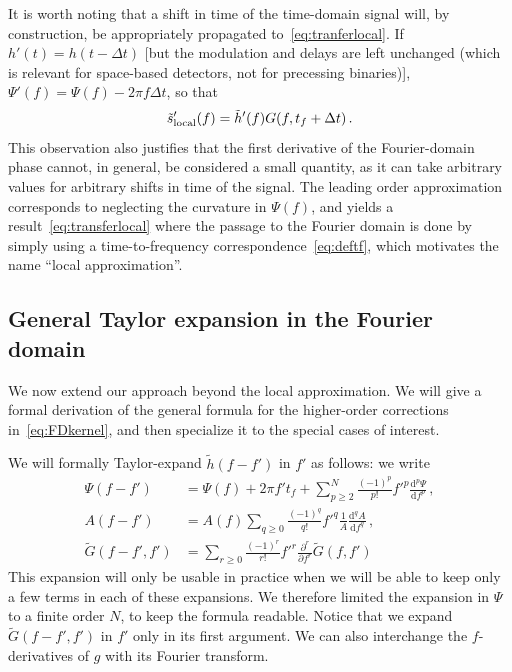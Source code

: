 \documentclass[aps,showpacs,twocolumn,
prd,superscriptaddress,nofootinbib]{revtex4-1}
\newcommand{\be}{\begin{equation}}
\newcommand{\ee}{\end{equation}}
\newcommand\ud{{\mathrm{d}}}
\newcommand{\tf}{t_{f}}
\begin{document}
It is worth noting that a shift in time of the time-domain signal will, by construction, be appropriately propagated to~\eqref{eq:tranferlocal}. If $h'(t) = h(t -  \Delta t)$ [but the modulation and delays are left unchanged (which is relevant for space-based detectors, not for precessing binaries)], $\Psi'(f) = \Psi(f) - 2\pi f \Delta t$, so that
\be\label{eq:localshifted}
	\tilde{s}'_{\rm local}(f) = \tilde{h}'(f) G(f, \tf + \Delta t) \,. 
\ee
This observation also justifies that the first derivative of the Fourier-domain phase cannot, in general, be considered a small quantity, as it can take arbitrary values for arbitrary shifts in time of the signal. The leading order approximation corresponds to neglecting the curvature in $\Psi(f)$, and yields a result~\eqref{eq:transferlocal} where the passage to the Fourier domain is done by simply using a time-to-frequency correspondence~\eqref{eq:deftf}, which motivates the name ``local approximation''.


\subsection{General Taylor expansion in the Fourier domain}
\label{subsec:TaylorFD}

We now extend our approach beyond the local approximation. We will give a formal derivation of the  general formula for the higher-order corrections in~\eqref{eq:FDkernel}, and then specialize it to the special cases of interest.

We will formally Taylor-expand $\tilde{h}(f-f')$ in $f'$ as follows: we write
\begin{subequations}
\begin{align}
	\Psi(f-f') &= \Psi(f) + 2\pi f' \tf + \sum\limits_{p\geq 2}^{N} \frac{(-1)^{p}}{p!} {f'}^{p} \frac{\ud^{p} \Psi}{\ud f^{p}} \,, \label{eq:expandPsi}\\
	A(f-f') &= A(f) \sum\limits_{q\geq 0} \frac{(-1)^{q}}{q!} {f'}^{q} \frac{1}{A}\frac{\ud^{q} A}{\ud f^{q}} \,, \label{eq:expandA}\\
	\tilde{G}(f-f', f') &= \sum\limits_{r\geq 0} \frac{(-1)^{r}}{r!} {f'}^{r} \frac{\partial^{r} }{\partial f^{r}}  \tilde{G}(f,f') \label{eq:expandg}
\end{align}
\end{subequations}
This expansion will only be usable in practice when we will be able to keep only a few terms in each of these expansions. We therefore limited the expansion in $\Psi$ to a finite order $N$, to keep the formula readable. Notice that we expand $\tilde{G}(f-f',f')$ in $f'$ only in its first argument. We can also interchange the $f$-derivatives of $g$ with its Fourier transform.
\end{document}
